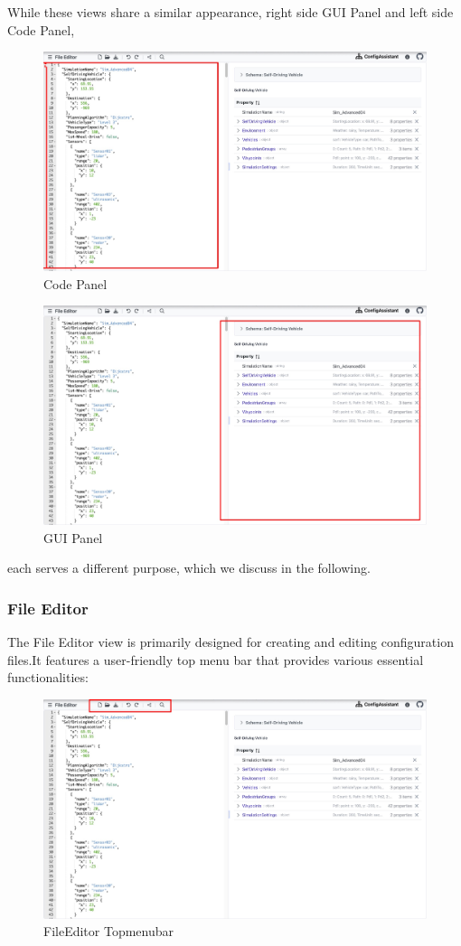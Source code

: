 While these views share a similar appearance, right side GUI Panel and left side Code Panel,
\begin{figure}[h]
    \includegraphics[width=3.5 in]{figures/Code Panel}
    \caption{Code Panel}
\end{figure}
\begin{figure}[h]
    \includegraphics[width=3.5 in]{figures/GUI Panel.jpg}
    \caption{GUI Panel}
\end{figure}
each serves a different purpose, which we discuss in the following.

\subsubsection{File Editor}
The File Editor view is primarily designed for creating and editing configuration files.It features a user-friendly top menu bar that provides various essential functionalities:
\begin{figure}[h]
    \includegraphics[width=3.5 in]{figures/FileeditorTopmenubar}
    \caption{FileEditor Topmenubar}
\end{figure}

